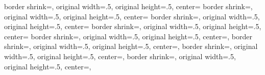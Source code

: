 %
%
%
%
%
%
{%
	\edef\pgfpageoptionheight{\the\paperheight}%
	\edef\pgfpageoptionwidth{\the\paperwidth}%
	\edef\pgfpageoptionborder{1pt}%
}
{%
  {%
    border shrink=\pgfpageoptionborder,%
	original width=.5\pgfpageoptionheight,%
	original height=.5\pgfpageoptionwidth,%
    center=\pgfpoint{0\pgfphysicalwidth}{\pgfphysicalheight}%
  }%
  {%
    border shrink=\pgfpageoptionborder,%
	original width=.5\pgfpageoptionheight,%
	original height=.5\pgfpageoptionwidth,%
    center=\pgfpoint{.5\pgfphysicalwidth}{\pgfphysicalheight}%
  }%
  {%
    border shrink=\pgfpageoptionborder,%
	original width=.5\pgfpageoptionheight,%
	original height=.5\pgfpageoptionwidth,%
    center=\pgfpoint{0\pgfphysicalwidth}{.5\pgfphysicalheight}%
  }%
  {%
    border shrink=\pgfpageoptionborder,%
	original width=.5\pgfpageoptionheight,%
	original height=.5\pgfpageoptionwidth,%
    center=\pgfpoint{.5\pgfphysicalwidth}{.5\pgfphysicalheight}%
  }%
  {%
  	border shrink=\pgfpageoptionborder,%
	original width=.5\pgfpageoptionheight,%
	original height=.5\pgfpageoptionwidth,%
    center=\pgfpoint{.5\pgfphysicalwidth}{\pgfphysicalheight},%
  }%
  {%
  	border shrink=\pgfpageoptionborder,%
	original width=.5\pgfpageoptionheight,%
	original height=.5\pgfpageoptionwidth,%
    center=\pgfpoint{0\pgfphysicalwidth}{\pgfphysicalheight},%
  }%
  {%
	border shrink=\pgfpageoptionborder,%
	original width=.5\pgfpageoptionheight,%
	original height=.5\pgfpageoptionwidth,%
    center=\pgfpoint{.5\pgfphysicalwidth}{.5\pgfphysicalheight},%
  }%
  {%
	border shrink=\pgfpageoptionborder,%
	original width=.5\pgfpageoptionheight,%
	original height=.5\pgfpageoptionwidth,%
    center=\pgfpoint{0\pgfphysicalwidth}{.5\pgfphysicalheight},%
  }%
}%